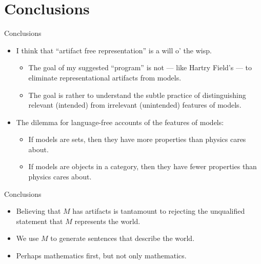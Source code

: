 \documentclass{beamer}
\begin{document}
\section{Conclusions}

\begin{frame}{Conclusions}

\begin{itemize}
\item I think that ``artifact free representation'' is a will o' the
  wisp.
  \begin{itemize}
  \item The goal of my suggested ``program'' is not --- like Hartry
    Field's --- to eliminate representational artifacts from models.
  \item The goal is rather to understand the subtle practice of
    distinguishing relevant (intended) from irrelevant (unintended)
    features of models.
  \end{itemize}
\item The dilemma for language-free accounts of the features of
  models:
  \begin{itemize}
  \item If models are sets, then they have more properties than
    physics cares about.
  \item If models are objects in a category, then they have fewer
    properties than physics cares about.
  \end{itemize}
\end{itemize}

\end{frame}


\begin{frame}{Conclusions}

  \begin{itemize}
  \item Believing that $M$ has artifacts is tantamount to rejecting
    the unqualified statement that $M$ represents the world.
  \item We use $M$ to generate sentences that describe the world.
  \item Perhaps mathematics first, but not only mathematics.
  \end{itemize}

\end{frame}  




\end{document}
